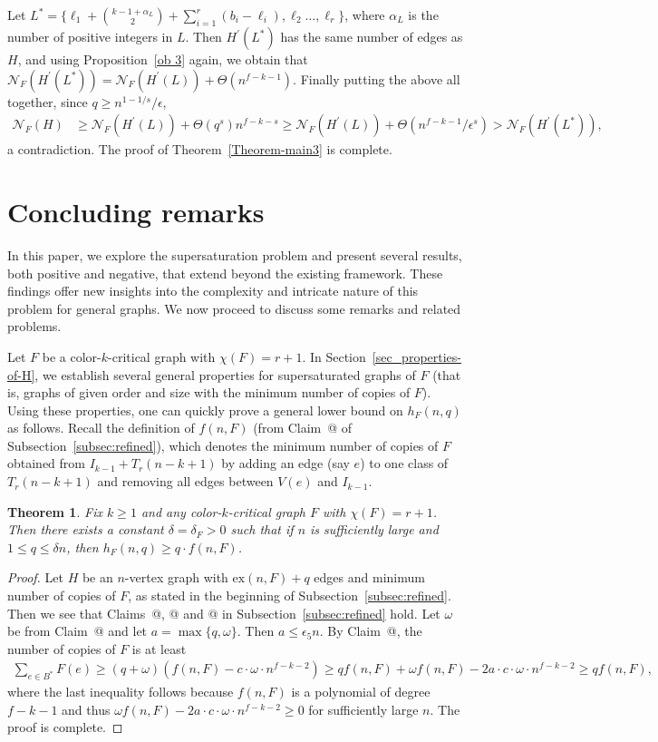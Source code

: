 \documentclass[10pt]{article}
\makeatletter
\newtheorem{theorem}{Theorem}[section]
\newcommand*{\rom}[1]{\expandafter\@slowromancap\romannumeral #1@}
\def\ex{\mathrm{ex}}
\def\QED{{\hfill\enspace\vrule height8pt depth0pt width8pt}}
\makeatother
\begin{document}
Let $L^\ast=\{\ell_1+{k-1+\alpha_L \choose 2}+\sum_{i=1}^{r}(b_i-\ell_i),\ell_2\ldots,\ell_r\}$, where $\alpha_L$ is the number of positive integers in $L$.
Then $H^\prime(L^\ast)$ has the same number of edges as $H$, and using Proposition~\ref{ob 3} again,
we obtain that $\mathcal{N}_F(H^\prime(L^\ast))=\mathcal{N}_F(H^\prime(L))+\Theta(n^{f-k-1})$.
Finally putting the above all together, since $q\geq n^{1-1/s}/\epsilon$,
\begin{align*}
\mathcal{N}_F(H)&\geq \mathcal{N}_F(H^\prime(L))+\Theta(q^s)n^{f-k-s}\geq \mathcal{N}_F(H^\prime(L))+\Theta(n^{f-k-1}/\epsilon^s)>\mathcal{N}_F(H^\prime(L^\ast)),
\end{align*}
a contradiction. The proof of Theorem~\ref{Theorem-main3} is complete.
\QED


\section{Concluding remarks}
In this paper, we explore the supersaturation problem and present several results, both positive and negative, that extend beyond the existing framework. These findings offer new insights into the complexity and intricate nature of this problem for general graphs.
We now proceed to discuss some remarks and related problems.

Let $F$ be a color-$k$-critical graph with $\chi(F)=r+1$.
In Section~\ref{sec_properties-of-H}, we establish several general properties for supersaturated graphs of $F$ (that is, graphs of given order and size with the minimum number of copies of $F$). Using these properties, one can quickly prove a general lower bound on $h_F(n,q)$ as follows.
Recall the definition of $f(n,F)$ (from Claim~\rom{3} of Subsection~\ref{subsec:refined}), 
which denotes the minimum number of copies of $F$ obtained from $I_{k-1}+ T_r(n-k+1)$ by adding an edge (say $e$) to one class of $T_r(n-k+1)$ and removing all edges between $V(e)$ and $I_{k-1}$.

\begin{theorem}
Fix $k\geq 1$ and any color-$k$-critical graph $F$ with $\chi(F)=r+1$.
Then there exists a constant $\delta = \delta_F>0$ such that if $n$ is sufficiently large and $1\leq q\leq \delta n$, then
$h_F (n, q) \geq q\cdot f(n, F)$.
\end{theorem}
\begin{proof}
Let $H$ be an $n$-vertex graph with $\ex(n,F)+q$ edges and minimum number of copies of $F$, as stated in the beginning of Subsection~\ref{subsec:refined}.
Then we see that Claims~\rom{1}, \rom{2} and \rom{3} in Subsection~\ref{subsec:refined} hold.
Let $\omega$ be from Claim~\rom{3} and let $a=\max\{q,\omega\}$.
Then $a\leq \epsilon_5 n$. By Claim~\rom{3}, the number of copies of $F$ is at least
\begin{align*}
\sum_{e\in B^*}F(e)\geq (q+ \omega)(f(n,F)-  c\cdot \omega\cdot n^{f-k-2})
\geq qf(n,F)+\omega f(n,F)-2a \cdot c\cdot \omega\cdot n^{f-k-2} \geq qf(n,F),
\end{align*}
where the last inequality follows because $f(n,F)$ is a polynomial of degree $f-k-1$ and thus $\omega f(n,F)-2a \cdot c\cdot \omega\cdot n^{f-k-2}\geq 0$ for sufficiently large $n$. The proof is complete.
\end{proof}
\end{document}
